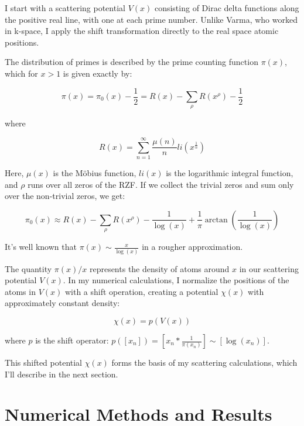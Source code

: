 \documentclass[11pt, oneside]{article}
\begin{document}
I start with a scattering potential $V(x)$ consisting of Dirac delta functions along the positive real line, with one at each prime number. Unlike Varma, who worked in k-space, I apply the shift transformation directly to the real space atomic positions.

The distribution of primes is described by the prime counting function $\pi(x)$, which for $x > 1$ is given exactly by:

\begin{equation}
\pi(x) = \pi_0(x) - \frac{1}{2} = R(x) - \sum_{\rho}R(x^{\rho}) - \frac{1}{2}
\end{equation}

where

\begin{equation}
R(x) = \sum_{n=1}^{\infty}\frac{\mu(n)}{n}li(x^{\frac{1}{n}})
\end{equation}

Here, $\mu(x)$ is the Möbius function, $li(x)$ is the logarithmic integral function, and $\rho$ runs over all zeros of the RZF. If we collect the trivial zeros and sum only over the non-trivial zeros, we get:

\begin{equation}
\pi_0(x) \approx R(x) - \sum_{\rho}R(x^{\rho}) - \frac{1}{\log(x)} + \frac{1}{\pi}\arctan(\frac{1}{\log(x)})
\end{equation}

It's well known that $\pi(x) \sim \frac{x}{\log(x)}$ in a rougher approximation.

The quantity $\pi(x)/x$ represents the density of atoms around $x$ in our scattering potential $V(x)$. In my numerical calculations, I normalize the positions of the atoms in $V(x)$ with a shift operation, creating a potential $\chi(x)$ with approximately constant density:

\begin{equation}
\chi(x) = p(V(x))
\end{equation}

where $p$ is the shift operator: $p([x_n]) = [x_n * \frac{1}{\pi(x_n)}] \sim [\log(x_n)]$.

This shifted potential $\chi(x)$ forms the basis of my scattering calculations, which I'll describe in the next section.

\section{Numerical Methods and Results}
\end{document}

